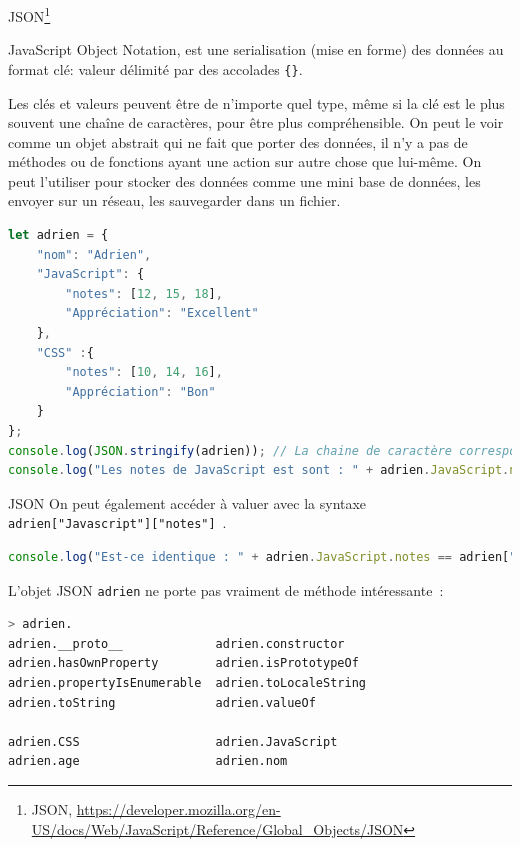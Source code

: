 \documentclass{beamer}
\begin{document}
    \begin{frame}[fragile]{JSON\footnote{JSON, \url{https://developer.mozilla.org/en-US/docs/Web/JavaScript/Reference/Global_Objects/JSON}}}
        \begin{footnotesize}
            JavaScript Object Notation, est une serialisation (mise en forme) des données au format clé: valeur délimité par des accolades \lstinline!{}!.

            Les clés et valeurs peuvent être de n'importe quel type, même si la clé est le plus souvent une chaîne de caractères, pour être plus compréhensible.
            \bigbreak
            On peut le voir comme un objet abstrait qui ne fait que porter des données, il n'y a pas de méthodes ou de fonctions ayant une action sur autre chose que lui-même.
            On peut l'utiliser pour stocker des données comme une mini base de données, les envoyer sur un réseau, les sauvegarder dans un fichier.
        \end{footnotesize}
        \begin{lstlisting}[language=JavaScript,title={\scriptsize{Script JavaScript}},basicstyle=\tiny\ttfamily]
let adrien = {
    "nom": "Adrien",
    "JavaScript": {
        "notes": [12, 15, 18],
        "Appréciation": "Excellent"
    },
    "CSS" :{
        "notes": [10, 14, 16],
        "Appréciation": "Bon"
    }
};
console.log(JSON.stringify(adrien)); // La chaine de caractère correspondante
console.log("Les notes de JavaScript est sont : " + adrien.JavaScript.notes);
        \end{lstlisting}
    \end{frame}

    \begin{frame}[fragile]{JSON}
        On peut également accéder à valuer avec la syntaxe \lstinline{adrien["Javascript"]["notes"]}~.
        \begin{lstlisting}[language=JavaScript,title={\scriptsize{Script JavaScript}}]
console.log("Est-ce identique : " + adrien.JavaScript.notes == adrien["Javascript"]["notes"]);
        \end{lstlisting}
        \bigbreak
        L'objet JSON \lstinline{adrien} ne porte pas vraiment de méthode intéressante~:
        \begin{lstlisting}[language=Bash,title={\scriptsize{Node.js}}]
> adrien.
adrien.__proto__             adrien.constructor
adrien.hasOwnProperty        adrien.isPrototypeOf
adrien.propertyIsEnumerable  adrien.toLocaleString
adrien.toString              adrien.valueOf

adrien.CSS                   adrien.JavaScript
adrien.age                   adrien.nom
        \end{lstlisting}
    \end{frame}
\end{document}
